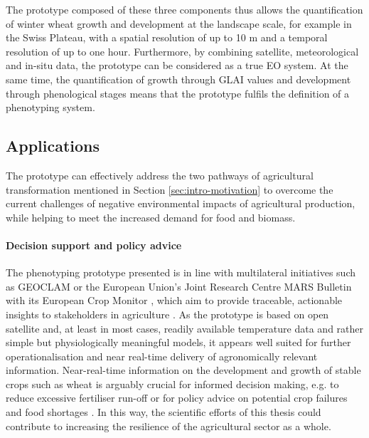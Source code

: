 The prototype composed of these three components thus allows the quantification of winter wheat growth and development at the landscape scale, for example in the Swiss Plateau, with a spatial resolution of up to 10 m and a temporal resolution of up to one hour. Furthermore, by combining satellite, meteorological and in-situ data, the prototype can be considered as a true \gls{EO} system. At the same time, the quantification of growth through \gls{GLAI} values and development through phenological stages means that the prototype fulfils the definition of a phenotyping system.

\subsection{Applications}
The prototype can effectively address the two pathways of agricultural transformation mentioned in Section \ref{sec:intro-motivation} to overcome the current challenges of negative environmental impacts of agricultural production, while helping to meet the increased demand for food and biomass.

\paragraph{Decision support and policy advice}
The phenotyping prototype presented is in line with multilateral initiatives such as \gls{GEOCLAM} or the European Union's Joint Research Centre MARS Bulletin with its European Crop Monitor \citep{van_der_velde_use_2019}, which aim to provide traceable, actionable insights to stakeholders in agriculture \citep{whitcraft_no_2019}. As the prototype is based on open satellite and, at least in most cases, readily available temperature data and rather simple but physiologically meaningful models, it appears well suited for further operationalisation and near real-time delivery of agronomically relevant information. Near-real-time information on the development and growth of stable crops such as wheat is arguably crucial for informed decision making, e.g. to reduce excessive fertiliser run-off \citep{argento_linking_2022} or for policy advice on potential crop failures and food shortages \citep{becker-reshef_strengthening_2020}. In this way, the scientific efforts of this thesis could contribute to increasing the resilience of the agricultural sector as a whole.

